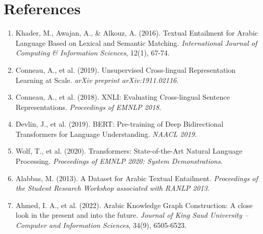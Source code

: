 \section{References}

\begin{enumerate}[nosep]
    \item Khader, M., Awajan, A., \& Alkouz, A. (2016). Textual Entailment for Arabic Language Based on Lexical and Semantic Matching. \textit{International Journal of Computing \& Information Sciences}, 12(1), 67-74.
    \item Conneau, A., et al. (2019). Unsupervised Cross-lingual Representation Learning at Scale. \textit{arXiv preprint arXiv:1911.02116}.
    \item Conneau, A., et al. (2018). XNLI: Evaluating Cross-lingual Sentence Representations. \textit{Proceedings of EMNLP 2018}.
    \item Devlin, J., et al. (2019). BERT: Pre-training of Deep Bidirectional Transformers for Language Understanding. \textit{NAACL 2019}.
    \item Wolf, T., et al. (2020). Transformers: State-of-the-Art Natural Language Processing. \textit{Proceedings of EMNLP 2020: System Demonstrations}.
    \item Alabbas, M. (2013). A Dataset for Arabic Textual Entailment. \textit{Proceedings of the Student Research Workshop associated with RANLP 2013}.
    \item Ahmed, I. A., et al. (2022). Arabic Knowledge Graph Construction: A close look in the present and into the future. \textit{Journal of King Saud University -- Computer and Information Sciences}, 34(9), 6505-6523.
\end{enumerate}
